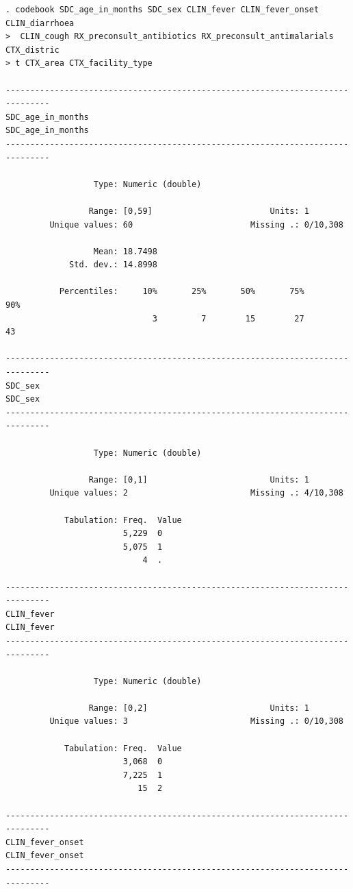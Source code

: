 \documentclass[
  letterpaper,
  DIV=11,
  numbers=noendperiod,
  oneside]{scrreprt}
\begin{document}
\begin{verbatim}
. codebook SDC_age_in_months SDC_sex CLIN_fever CLIN_fever_onset CLIN_diarrhoea
>  CLIN_cough RX_preconsult_antibiotics RX_preconsult_antimalarials CTX_distric
> t CTX_area CTX_facility_type

-------------------------------------------------------------------------------
SDC_age_in_months                                             SDC_age_in_months
-------------------------------------------------------------------------------

                  Type: Numeric (double)

                 Range: [0,59]                        Units: 1
         Unique values: 60                        Missing .: 0/10,308

                  Mean: 18.7498
             Std. dev.: 14.8998

           Percentiles:     10%       25%       50%       75%       90%
                              3         7        15        27        43

-------------------------------------------------------------------------------
SDC_sex                                                                 SDC_sex
-------------------------------------------------------------------------------

                  Type: Numeric (double)

                 Range: [0,1]                         Units: 1
         Unique values: 2                         Missing .: 4/10,308

            Tabulation: Freq.  Value
                        5,229  0
                        5,075  1
                            4  .

-------------------------------------------------------------------------------
CLIN_fever                                                           CLIN_fever
-------------------------------------------------------------------------------

                  Type: Numeric (double)

                 Range: [0,2]                         Units: 1
         Unique values: 3                         Missing .: 0/10,308

            Tabulation: Freq.  Value
                        3,068  0
                        7,225  1
                           15  2

-------------------------------------------------------------------------------
CLIN_fever_onset                                               CLIN_fever_onset
-------------------------------------------------------------------------------


\end{verbatim}
\end{document}
